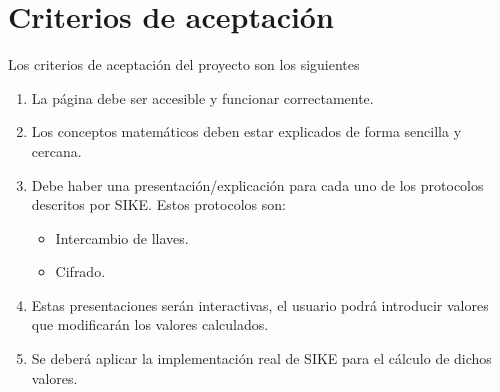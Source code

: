 \chapter{Criterios de aceptación}\label{critaceptacion}

Los criterios de aceptación del proyecto son los siguientes

\begin{enumerate}
    \item La página debe ser accesible y funcionar correctamente.
    \item Los conceptos matemáticos deben estar explicados de forma sencilla y cercana.
    \item Debe haber una presentación/explicación para cada uno de los protocolos descritos por SIKE. Estos protocolos son:
    \begin{itemize}
        \item Intercambio de llaves.
        \item Cifrado.
    \end{itemize}
    \item Estas presentaciones serán interactivas, el usuario podrá introducir valores que modificarán los valores calculados.
    \item Se deberá aplicar la implementación real de SIKE para el cálculo de dichos valores.
\end{enumerate}